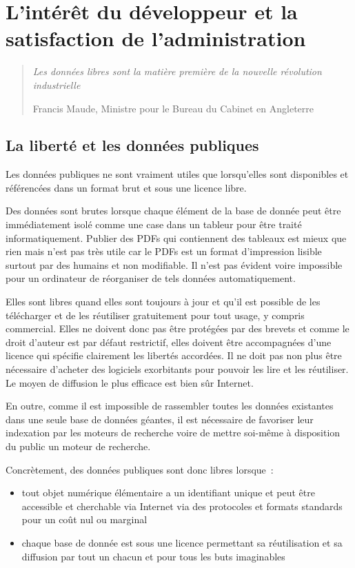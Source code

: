 \chapter{L'intérêt du développeur et la satisfaction de l'administration}\label{devadmin}

\begin{quotation}
\emph{Les données libres sont la matière première de la nouvelle révolution industrielle}

Francis Maude, Ministre pour le Bureau du Cabinet en Angleterre
\end{quotation}
\section{La liberté et les données publiques}
Les données publiques ne sont vraiment utiles que lorsqu'elles sont disponibles et référencées dans un format brut et sous une licence libre.

Des données sont brutes lorsque chaque élément de la base de donnée peut être immédiatement isolé comme une case dans un tableur pour être traité informatiquement. Publier des PDFs qui contiennent des tableaux est mieux que rien mais n'est pas très utile car le PDFs est un format d'impression lisible surtout par des humains et non modifiable. Il n'est pas évident voire impossible pour un ordinateur de réorganiser de tels données automatiquement.

Elles sont libres quand elles sont toujours à jour et qu'il est possible de les télécharger et de les réutiliser gratuitement pour tout usage, y compris commercial. Elles ne doivent donc pas être protégées par des brevets et comme le droit d'auteur est par défaut restrictif, elles doivent être accompagnées d'une licence qui spécifie clairement les libertés accordées. Il ne doit pas non plus être nécessaire d'acheter des logiciels exorbitants pour pouvoir les lire et les réutiliser. Le moyen de diffusion le plus efficace est bien sûr Internet.

En outre, comme il est impossible de rassembler toutes les données existantes dans une seule base de données géantes, il est nécessaire de favoriser leur indexation par les moteurs de recherche voire de mettre soi-même à disposition du public un moteur de recherche.

Concrètement, des données publiques sont donc libres lorsque~:

\begin{itemize}
\item tout objet numérique élémentaire a un identifiant unique et peut être accessible et cherchable via Internet via des protocoles et formats standards pour un coût nul ou marginal
\item chaque base de donnée est sous une licence permettant sa réutilisation et sa diffusion par tout un chacun et pour tous les buts imaginables
\end{itemize}

